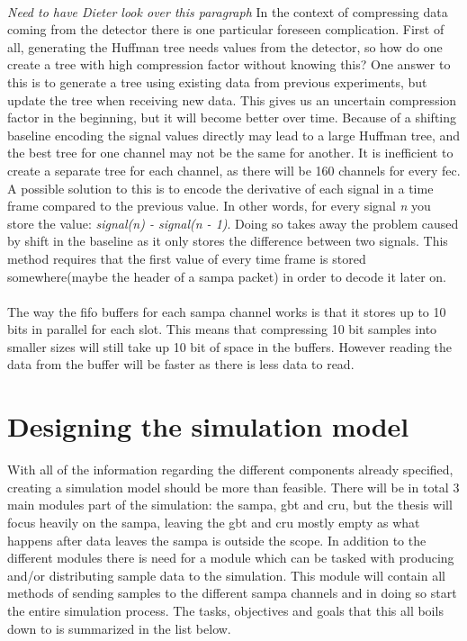 \documentclass[a4paper, 12pt]{report}
\begin{document}
\paragraph{}
\textit{Need to have Dieter look over this paragraph}
In the context of compressing data coming from the detector there is one particular foreseen complication.
First of all, generating the Huffman tree needs values from the detector, so how do one create a tree with high compression factor without knowing this?
One answer to this is to generate a tree using existing data from previous experiments, but update the tree when receiving new data.
This gives us an uncertain compression factor in the beginning, but it will become better over time.
Because of a shifting baseline encoding the signal values directly may lead to a large Huffman tree, and the best tree for one channel may not be the same for another.
It is inefficient to create a separate tree for each channel, as there will be 160 channels for every \gls{fec}.
A possible solution to this is to encode the derivative of each signal in a time frame compared to the previous value.
In other words, for every signal \textit{n} you store the value: \textit{signal(n) - signal(n - 1)}.
Doing so takes away the problem caused by shift in the baseline as it only stores the difference between two signals.
This method requires that the first value of every time frame is stored somewhere(maybe the header of a \gls{sampa} packet) in order to decode it later on.


\paragraph{}
The way the \gls{fifo} buffers for each \gls{sampa} channel works is that it stores up to 10 bits in parallel for each slot.
This means that compressing 10 bit samples into smaller sizes will still take up 10 bit of space in the buffers. 
However reading the data from the buffer will be faster as there is less data to read.

\section{Designing the simulation model}
With all of the information regarding the different components already specified, creating a simulation model should be more than feasible.
There will be in total 3 main modules part of the simulation: the \gls{sampa}, \gls{gbt} and \gls{cru}, but the thesis will focus heavily on the \gls{sampa}, leaving the \gls{gbt} and \gls{cru} mostly empty as what happens after data leaves the \gls{sampa} is outside the scope.
In addition to the different modules there is need for a module which can be tasked with producing and/or distributing sample data to the simulation.
This module will contain all methods of sending samples to the different \gls{sampa} channels and in doing so start the entire simulation process.
The tasks, objectives and goals that this all boils down to is summarized in the list below.
\end{document}
